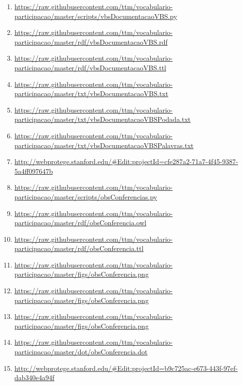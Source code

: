 \documentclass[12pt]{article}
\begin{document}
{\scriptsize
\begin{enumerate}
    \item \url{https://raw.githubusercontent.com/ttm/vocabulario-participacao/master/scripts/vbsDocumentacaoVBS.py}\label{i:1}
    \item \url{https://raw.githubusercontent.com/ttm/vocabulario-participacao/master/rdf/vbsDocumentacaoVBS.rdf}\label{i:2}
    \item \url{https://raw.githubusercontent.com/ttm/vocabulario-participacao/master/rdf/vbsDocumentacaoVBS.ttl}\label{i:3}
    \item \url{https://raw.githubusercontent.com/ttm/vocabulario-participacao/master/txt/vbsDocumentacaoVBS.txt} \label{i:4}
    \item \url{https://raw.githubusercontent.com/ttm/vocabulario-participacao/master/txt/vbsDocumentacaoVBSPodada.txt}\label{i:4_1}
    \item \url{https://raw.githubusercontent.com/ttm/vocabulario-participacao/master/txt/vbsDocumentacaoVBSPalavras.txt}\label{i:5}
    \item \url{http://webprotege.stanford.edu/#Edit:projectId=cfe287a2-71a7-4f45-9387-5a4ff097647b}\label{i:5wp}

    \item \url{https://raw.githubusercontent.com/ttm/vocabulario-participacao/master/scripts/obsConferencias.py}\label{i:6}
    \item \url{https://raw.githubusercontent.com/ttm/vocabulario-participacao/master/rdf/obsConferencia.owl}\label{i:7}
    \item \url{https://raw.githubusercontent.com/ttm/vocabulario-participacao/master/rdf/obsConferencia.ttl}\label{i:8}
    \item \url{https://raw.githubusercontent.com/ttm/vocabulario-participacao/master/figs/obsConferencia.png}\label{i:9}
    \item \url{https://raw.githubusercontent.com/ttm/vocabulario-participacao/master/figs/obsConferencia.png}\label{i:10}
    \item \url{https://raw.githubusercontent.com/ttm/vocabulario-participacao/master/figs/obsConferencia.png}\label{i:11}
    \item \url{https://raw.githubusercontent.com/ttm/vocabulario-participacao/master/dot/obsConferencia.dot}\label{i:11_1}
    \item \url{http://webprotege.stanford.edu/#Edit:projectId=b9c725ac-e673-443f-97ef-dab340e4a94f}\label{i:11wp}


\end{enumerate}}
\end{document}
